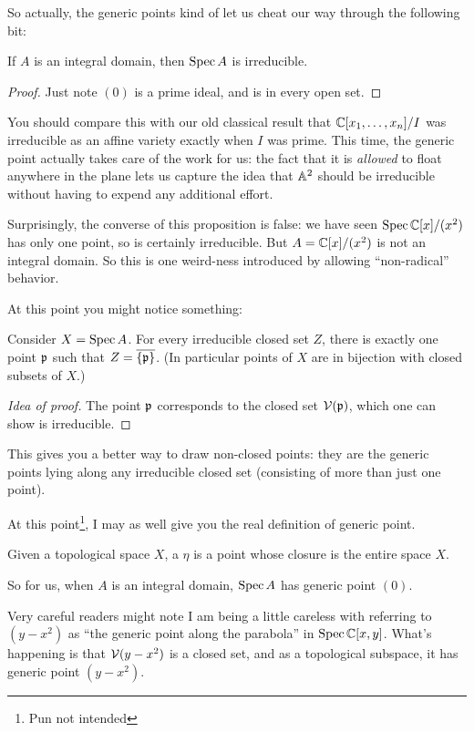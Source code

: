 So actually, the generic points
kind of let us cheat our way through the following bit:
\begin{proposition}
	If $A$ is an integral domain,
	then $\operatorname{Spec} A$ is irreducible.
\end{proposition}
\begin{proof}
	Just note $(0)$ is a prime ideal,
	and is in every open set.
\end{proof}
You should compare this with our old classical result that
$\mathbb C[x_1, \dots, x_n]/I$
was irreducible as an affine variety exactly when $I$ was prime.
This time, the generic point actually takes care
of the work for us:
the fact that it is \emph{allowed} to float
anywhere in the plane lets us capture the idea that
$\mathbb A^2$ should be irreducible
without having to expend any additional effort.
\begin{remark}
	Surprisingly, the converse of this proposition is false:
	we have seen $\operatorname{Spec} \mathbb C[x]/(x^2)$ has only one point,
	so is certainly irreducible.
	But $A = \mathbb C[x]/(x^2)$ is not an integral domain.
	So this is one weird-ness introduced by allowing ``non-radical'' behavior.
\end{remark}

At this point you might notice something:
\begin{theorem}
	Consider $X = \operatorname{Spec} A$.
	For every irreducible closed set $Z$,
	there is exactly one point $\mathfrak p$ such that $Z = \overline{\{\mathfrak p\}}$.
	(In particular points of $X$ are in bijection
	with closed subsets of $X$.)
\end{theorem}
\begin{proof}
	[Idea of proof]
	The point $\mathfrak p$ corresponds to the closed set $\mathcal V(\mathfrak p)$,
	which one can show is irreducible.
\end{proof}
This gives you a better way to draw non-closed points:
they are the generic points lying along any irreducible closed set
(consisting of more than just one point).

At this point\footnote{Pun not intended},
I may as well give you the real definition of generic point.
\begin{definition}
	Given a topological space $X$,
	a  $\eta$
	is a point whose closure is the entire space $X$.
\end{definition}
So for us, when $A$ is an integral domain,
$\operatorname{Spec} A$ has generic point $(0)$.
\begin{abuse}
	Very careful readers might note I am being a little careless
	with referring to $(y-x^2)$ as
	``the generic point along the parabola''
	in $\operatorname{Spec} \mathbb C[x,y]$.
	What's happening is that $\mathcal V(y-x^2)$ is a closed set,
	and as a topological subspace, it has generic point $(y-x^2)$.
\end{abuse}

